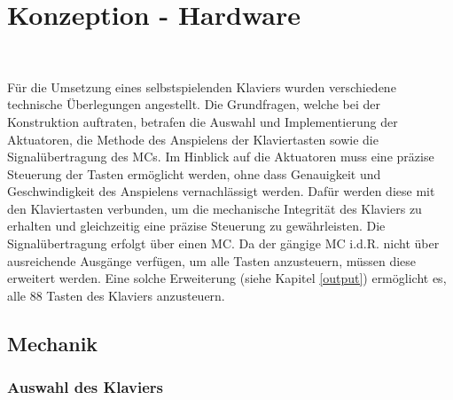 
\graphicspath{ {./img/} }

\chapter{Konzeption - Hardware}\label{konzeptionHW}~\nocite{*}


Für die Umsetzung eines selbstspielenden Klaviers wurden verschiedene technische Überlegungen angestellt.
Die Grundfragen, welche bei der Konstruktion auftraten, betrafen die Auswahl und Implementierung der
Aktuatoren, die Methode des Anspielens der Klaviertasten sowie die Signalübertragung des \ac{MC}s.
Im Hinblick auf die Aktuatoren muss eine präzise Steuerung der Tasten
ermöglicht werden, ohne dass Genauigkeit und Geschwindigkeit des Anspielens vernachlässigt werden.
\newline
Dafür werden diese mit den Klaviertasten verbunden, um die mechanische Integrität des Klaviers
zu erhalten und gleichzeitig eine präzise Steuerung zu gewährleisten.\newline
Die Signalübertragung erfolgt über einen \ac{MC}.
Da der gängige \ac{MC} i.d.R. nicht über ausreichende Ausgänge verfügen,
um alle Tasten anzusteuern, müssen diese erweitert werden.
Eine solche Erweiterung (siehe Kapitel \ref{output}) ermöglicht es, alle 88 Tasten des Klaviers anzusteuern.

\section{Mechanik}\label{konzeptionHW-mechanik}

\subsection{Auswahl des Klaviers}

